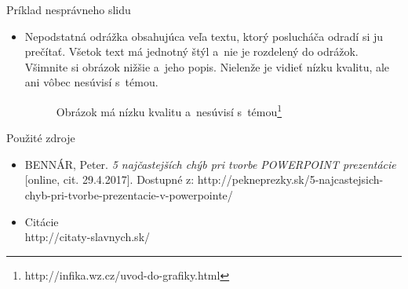 \documentclass[mode=present,paper=a4paper,orient=landscape, style=sailor]{powerdot}
\begin{document}
\begin{slide}{Príklad nesprávneho slidu}
\begin{itemize}
\item Nepodstatná odrážka obsahujúca veľa textu, ktorý poslucháča odradí si ju prečítať. Všetok text má jednotný štýl a~nie je rozdelený do odrážok. Všimnite si obrázok nižšie a~jeho popis. Nielenže je vidieť nízku kvalitu, ale ani vôbec nesúvisí s~témou. 
\begin{figure}[h]
\caption[Obrázok] {Obrázok má nízku kvalitu a~nesúvisí s~témou\footnote{http://infika.wz.cz/uvod-do-grafiky.html}}
\end{figure}
\end{itemize}
\end{slide}


\begin{slide}{Použité zdroje}
\begin{itemize}
\item BENNÁR, Peter. \textit{5 najčastejších chýb pri tvorbe POWERPOINT prezentácie} [online, cit. 29.4.2017]. Dostupné z: http://pekneprezky.sk/5-najcastejsich-chyb-pri-tvorbe-prezentacie-v-powerpointe/
\item Citácie\\ http://citaty-slavnych.sk/
\end{itemize}
\end{slide}
\end{document}
